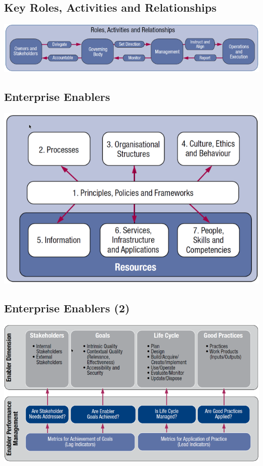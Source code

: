 \documentclass[a4]{article}
\begin{document}
\begin{multicols}{3}
\subsection{Key Roles, Activities and Relationships}
\begin{center}
    \includegraphics[width=\columnwidth]{cobit-key-roles.png}
\end{center}

\subsection{Enterprise Enablers}
\begin{center}
    \includegraphics[width=\columnwidth]{cobit-enterprise-enablers.png}
\end{center}

\subsection{Enterprise Enablers (2)}
\begin{center}
    \includegraphics[width=\columnwidth]{cobit-enterprise-enablers-2.png}
\end{center}


\end{multicols}
\end{document}
